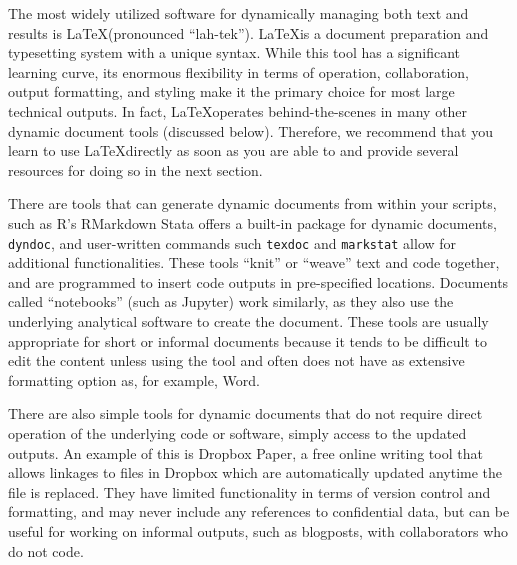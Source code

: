 The most widely utilized software
for dynamically managing both text and results is \LaTeX (pronounced ``lah-tek'').
\index{\LaTeX}
\LaTeX is a document preparation and typesetting system with a unique syntax.
While this tool has a significant learning curve,
its enormous flexibility in terms of operation, collaboration, output formatting, and styling
make it the primary choice for most large technical outputs.
In fact, \LaTeX operates behind-the-scenes in many other dynamic document tools (discussed below).
Therefore, we recommend that you learn to use \LaTeX directly
as soon as you are able to and provide several resources for doing so in the next section.

There are tools that can generate dynamic documents from within your scripts, 
such as R's RMarkdown
Stata offers a built-in package for dynamic documents, \texttt{dyndoc}, and user-written commands such \texttt{texdoc} and \texttt{markstat} allow for additional functionalities.
These tools ``knit'' or ``weave'' text and code together,
and are programmed to insert code outputs in pre-specified locations.
Documents called ``notebooks'' (such as Jupyter) work similarly,
as they also use the underlying analytical software to create the document.
These tools are usually appropriate for short or informal documents
because it tends to be difficult to edit the content unless using the tool 
and often does not have as extensive formatting option as, for example, Word.

There are also simple tools for dynamic documents
that do not require direct operation of the underlying code or software,
simply access to the updated outputs.
An example of this is Dropbox Paper,
a free online writing tool that allows linkages to files in Dropbox
which are automatically updated anytime the file is replaced.
They have limited functionality in terms of version control and formatting,
and may never include any references to confidential data,
but can be useful for working on informal outputs, such as blogposts,
with collaborators who do not code. 



